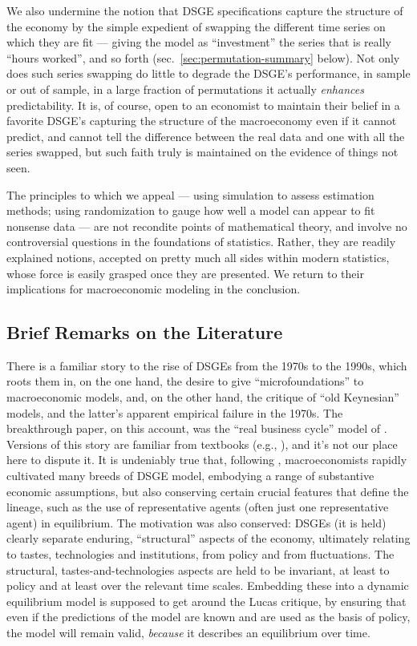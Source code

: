 \documentclass[11pt]{article}
\begin{document}
We also undermine the notion that DSGE specifications capture the
structure of the economy by the simple expedient of swapping the
different time series on which they are fit --- giving the model as
``investment'' the series that is really ``hours worked'', and so forth
(sec.~\ref{sec:permutation-summary} below). Not only does such series
swapping do little to degrade the DSGE's performance, in sample or out
of sample, in a large fraction of permutations it actually
\emph{enhances} predictability. It is, of course, open to an economist
to maintain their belief in a favorite DSGE's capturing the structure of
the macroeconomy even if it cannot predict, and cannot tell the
difference between the real data and one with all the series swapped,
but such faith truly is maintained on the evidence of things not seen.

The principles to which we appeal --- using simulation to assess
estimation methods; using randomization to gauge how well a model can
appear to fit nonsense data --- are not recondite points of mathematical
theory, and involve no controversial questions in the foundations of
statistics. Rather, they are readily explained notions, accepted on
pretty much all sides within modern statistics, whose force is easily
grasped once they are presented. We return to their implications for
macroeconomic modeling in the conclusion.

\hypertarget{brief-remarks-on-the-literature}{%
\subsection{Brief Remarks on the
Literature}\label{brief-remarks-on-the-literature}}

There is a familiar story to the rise of DSGEs from the 1970s to the
1990s, which roots them in, on the one hand, the desire to give
``microfoundations'' to macroeconomic models, and, on the other hand,
the \citet{Lucas1976} critique of ``old Keynesian'' models, and the
latter's apparent empirical failure in the 1970s. The breakthrough
paper, on this account, was the ``real business cycle'' model of
\citet{KydlandPrescott1982}. Versions of this story are familiar from
textbooks (e.g., \citealt{DeJongDave2007}), and it's not our place here
to dispute it. It is undeniably true that, following
\citet{KydlandPrescott1982}, macroeconomists rapidly cultivated many
breeds of DSGE model, embodying a range of substantive economic
assumptions, but also conserving certain crucial features that define
the lineage, such as the use of representative agents (often just one
representative agent) in equilibrium. The motivation was also conserved:
DSGEs (it is held) clearly separate enduring, ``structural'' aspects of
the economy, ultimately relating to tastes, technologies and
institutions, from policy and from fluctuations. The structural,
tastes-and-technologies aspects are held to be invariant, at least to
policy and at least over the relevant time scales. Embedding these into
a dynamic equilibrium model is supposed to get around the Lucas
critique, by ensuring that even if the predictions of the model are
known and are used as the basis of policy, the model will remain valid,
\emph{because} it describes an equilibrium over time.
\end{document}
